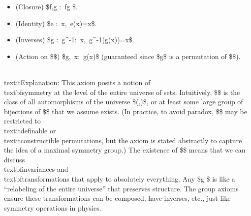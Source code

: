 \documentclass[11pt]{article}
\begin{document}
\begin{itemize}
  \item (Closure) \$\forall f,g \in \Sym:\ f\circ g \in \Sym\$.
  \item (Identity) \$\exists e \in \Sym:\ \forall x\in \infty,\ e(x)=x\$.
  \item (Inverses) \$\forall g \in \Sym:\ \exists g^{-1}\in \Sym:\ \forall x,\ g^{-1}(g(x))=x\$.
  \item (Action on \$\infty\$) \$\forall g\in\Sym,\ \forall x\in \infty:\ g(x)\in \infty\$ (guaranteed since \$g\$ is a permutation of \$\infty\$).

\end{itemize}
    \\textit{Explanation:} This axiom posits a notion of \\textbf{symmetry at the level of the entire universe of sets}. Intuitively, \$\Sym\$ is the class of all automorphisms of the universe \$(\infty,\in)\$, or at least some large group of bijections of \$\infty\$ that we assume exists. (In practice, to avoid paradox, \$\Sym\$ may be restricted to \\textit{definable} or \\textit{constructible} permutations, but the axiom is stated abstractly to capture the idea of a maximal symmetry group.) The existence of \$\Sym\$ means that we can discuss \\textbf{invariances} and \\textbf{transformations} that apply to absolutely everything. Any \$g \in \Sym\$ is like a “relabeling of the entire universe” that preserves structure. The group axioms ensure these transformations can be composed, have inverses, etc., just like symmetry operations in physics.
\end{document}

